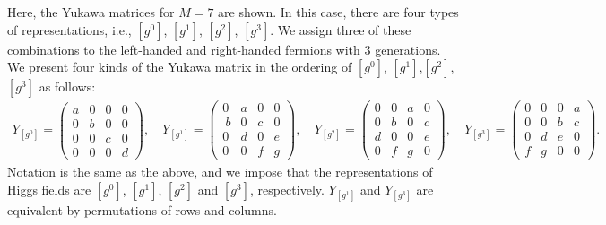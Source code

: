 \documentclass[a4paper,11pt]{article}
\numberwithin{equation}{section}
\begin{document}
Here, the Yukawa matrices for $M=7$ are shown.
In this case, there are four types of representations, i.e., $[g^0]$, $[g^1]$, $[g^2]$, $[g^3]$. 
We assign three of these combinations to the left-handed and right-handed fermions with 3 generations. 
We present four kinds of the Yukawa matrix in the ordering of $[g^0]$, $[g^1]$,$[g^2]$, $[g^3]$ as follows:
\begin{align}
Y_{[g^0]}=
\begin{pmatrix}
a & 0 & 0 & 0 \\
0 & b & 0 & 0 \\
0 & 0 & c & 0 \\
0 & 0 & 0 & d
\end{pmatrix}
,\quad
Y_{[g^1]}=
\begin{pmatrix}
0 & a & 0 & 0\\\
b & 0 & c & 0\\
0 & d & 0 & e \\
0 & 0 & f & g
\end{pmatrix}
,\quad
Y_{[g^2]}=
\begin{pmatrix}
0 & 0 & a & 0 \\
0 & b & 0 & c\\
d & 0 & 0 & e \\
0 & f & g & 0
\end{pmatrix}
,\quad
Y_{[g^3]}=
\begin{pmatrix}
0 & 0 & 0 & a \\
0 & 0 & b & c \\
0 & d & e & 0 \\
f & g & 0 & 0
\end{pmatrix}
.
\end{align}
Notation is the same as the above, 
and we impose that the representations of Higgs fields are $[g^0]$, $[g^1]$, $[g^2]$ and $[g^3]$, respectively. 
$Y_{[g^1]}$ and $Y_{[g^3]}$ are equivalent by 
permutations of rows and columns.
\end{document}
